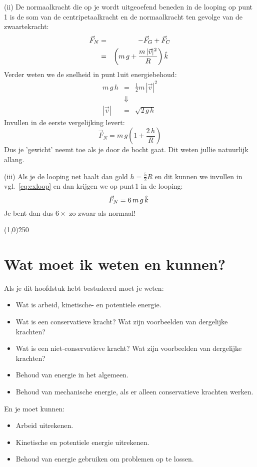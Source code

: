 \begin{voorbeeld}
{(ii) De normaalkracht die op je wordt uitgeoefend beneden in de looping op punt\,1 is 
de som van de centripetaalkracht en de normaalkracht ten gevolge van de zwaartekracht:
\begin{eqnarray}
\vec{F}_N & = & -\vec{F}_G +\vec{F}_C \\
& = & \left(m\,g + \frac{m\,|\vec{v}|^2}{R}\right)\hat{k}~
\end{eqnarray}
Verder weten we de snelheid in punt\,1uit energiebehoud:
\begin{eqnarray}
m\,g\,h & = & \frac{1}{2}m\,|\vec{v}|^2\\
&\Downarrow&\\
|\vec{v}| & = & \sqrt{2\,g\,h}
\end{eqnarray}
Invullen in de eerste vergelijking levert:
\begin{equation}\label{eq:exloop}
\vec{F}_N = m\,g\left(1 + \frac{2\,h}{R}\right) 
\end{equation}
Dus je 'gewicht' neemt toe als je door de bocht gaat. Dit weten jullie natuurlijk allang.

(iii) Als je de looping net haalt dan gold $h=\frac{5}{2}R$ en dit kunnen we invullen
in vgl.~\ref{eq:exloop} en dan krijgen we op punt\,1 in de looping:
\begin{equation}
\vec{F}_N  = 6\,m\,g\,\hat{k}~
\end{equation}
Je bent dan dus $6\times$ zo zwaar als normaal!
}
\end{voorbeeld}

\begin{center}
\line(1,0){250}
\end{center}

\section{Wat moet ik weten en kunnen?}

Als je dit hoofdstuk hebt bestudeerd moet je weten:
\begin{itemize}
\item Wat is arbeid, kinetische- en potentiele energie.
\item Wat is een conservatieve kracht? Wat zijn voorbeelden van dergelijke krachten?
\item Wat is een niet-conservatieve kracht? Wat zijn voorbeelden van dergelijke krachten?
\item Behoud van energie in het algemeen.
\item Behoud van mechanische energie, als er alleen conservatieve krachten werken.
\end{itemize}
En je moet kunnen:
\begin{itemize}
\item Arbeid uitrekenen.
\item Kinetische en potentiele energie uitrekenen.
\item Behoud van energie gebruiken om problemen op te lossen.
\end{itemize}

